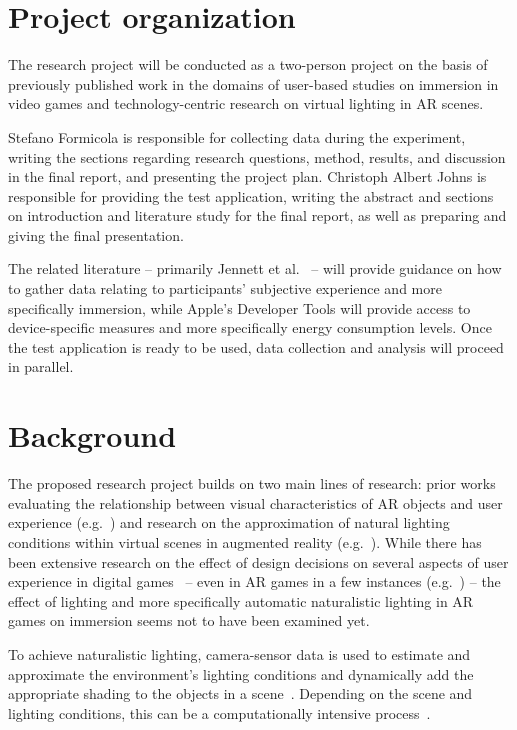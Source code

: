 \documentclass[12pt,twoside,english]{article}
\begin{document}
\section{Project organization}
\label{sect:organization}

The research project will be conducted as a two-person project on the basis of previously published work in the domains of user-based studies on immersion in video games and technology-centric research on virtual lighting in \gls{AR} scenes.

Stefano Formicola is responsible for collecting data during the experiment, writing the sections regarding research questions, method, results, and discussion in the final report, and presenting the project plan.
Christoph Albert Johns is responsible for providing the test application, writing the abstract and sections on introduction and literature study for the final report, as well as preparing and giving the final presentation.

The related literature -- primarily Jennett et al.~\cite{jennett_measuring_2008} -- will provide guidance on how to gather data relating to participants' subjective experience and more specifically immersion, while Apple's Developer Tools will provide access to device-specific measures and more specifically energy consumption levels.
Once the test application is ready to be used, data collection and analysis will proceed in parallel.


\section{Background}
\label{sect:background}
The proposed research project builds on two main lines of research: prior works evaluating the relationship between visual characteristics of \gls{AR} objects and user experience (e.g.~\cite{gabbard_effects_2006}) and research on the approximation of natural lighting conditions within virtual scenes in augmented reality (e.g.~\cite{aittala_inverse_2010}).
While there has been extensive research on the effect of design decisions on several aspects of user experience in digital games~\cite{johnson_validation_2018} -- even in \gls{AR} games in a few instances (e.g.~\cite{georgiou_development_2017}) -- the effect of lighting and more specifically automatic naturalistic lighting in \gls{AR} games on immersion seems not to have been examined yet.

To achieve naturalistic lighting, camera-sensor data is used to estimate and approximate the environment's lighting conditions and dynamically add the appropriate shading to the objects in a scene~\cite{apple_arlightestimate_nodate,apple_pointlight_nodate}.
Depending on the scene and lighting conditions, this can be a computationally intensive process~\cite{steed_constructing_2016}.
\end{document}
